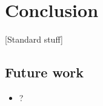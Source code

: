 \section{Conclusion}\label{conclusion}

{[}Standard stuff{]}

\subsection{Future work}\label{future-work}

\begin{itemize}
\itemsep1pt\parskip0pt
\item
  ?
\end{itemize}
